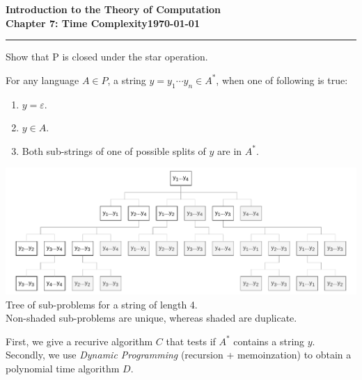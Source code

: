 \documentclass[11pt]{article}
\newcommand{\dated}{\today}
\begin{document}
\textbf{Introduction to the Theory of
Computation}\hfill\textbf{\myname}\\[0.01in]
\textbf{Chapter 7: Time Complexity}\hfill\textbf{\dated}\\
\smallskip\hrule\bigskip

\begin{problem}{7.15}
Show that P is closed under the star operation.
\end{problem}
\begin{idea}
For any language $A \in P$, a string $y = y_1 \cdots y_n \in A^{*}$, when one of following is true:
\begin{enumerate}
\item $y = \varepsilon$.
\item $y \in A$.
\item Both sub-strings of one of possible splits of $y$ are in $A^{*}$.
\end{enumerate}
\begin{center}
\includegraphics[scale=0.60]{Figures/Problem7.15a.pdf} \\
Tree of sub-problems for a string of length 4. \\
Non-shaded sub-problems are unique, whereas shaded are duplicate.
\end{center}
First, we give a recurive algorithm $C$ that tests if $A^{*}$ contains a string $y$. Secondly, we use \textit{Dynamic Programming} (recursion + memoinzation) to obtain a polynomial time algorithm $D$.
\end{idea}
\end{document}
